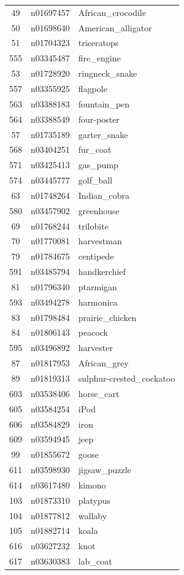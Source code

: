 \begin{table}
\begin{tabular}{cll}
49 & n01697457 & African_crocodile \\
50 & n01698640 & American_alligator \\
51 & n01704323 & triceratops \\
555 & n03345487 & fire_engine \\
53 & n01728920 & ringneck_snake \\
557 & n03355925 & flagpole \\
563 & n03388183 & fountain_pen \\
564 & n03388549 & four-poster \\
57 & n01735189 & garter_snake \\
568 & n03404251 & fur_coat \\
571 & n03425413 & gas_pump \\
574 & n03445777 & golf_ball \\
63 & n01748264 & Indian_cobra \\
580 & n03457902 & greenhouse \\
69 & n01768244 & trilobite \\
70 & n01770081 & harvestman \\
79 & n01784675 & centipede \\
591 & n03485794 & handkerchief \\
81 & n01796340 & ptarmigan \\
593 & n03494278 & harmonica \\
83 & n01798484 & prairie_chicken \\
84 & n01806143 & peacock \\
595 & n03496892 & harvester \\
87 & n01817953 & African_grey \\
89 & n01819313 & sulphur-crested_cockatoo \\
603 & n03538406 & horse_cart \\
605 & n03584254 & iPod \\
606 & n03584829 & iron \\
609 & n03594945 & jeep \\
99 & n01855672 & goose \\
611 & n03598930 & jigsaw_puzzle \\
614 & n03617480 & kimono \\
103 & n01873310 & platypus \\
104 & n01877812 & wallaby \\
105 & n01882714 & koala \\
616 & n03627232 & knot \\
617 & n03630383 & lab_coat \\

\end{tabular}
\end{table}
